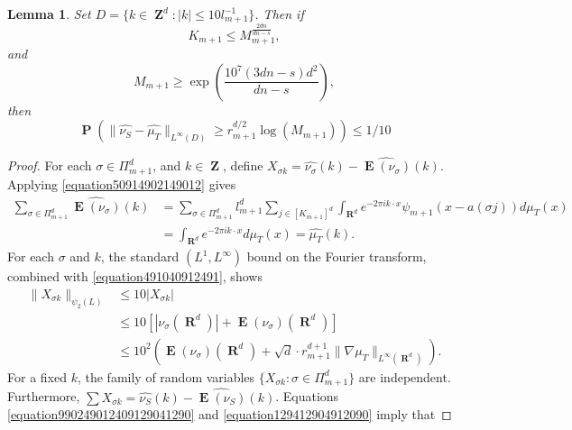 \documentclass[12pt,reqno]{article}
\numberwithin{equation}{section}
\DeclareMathOperator{\RR}{\mathbf{R}}
\DeclareMathOperator{\ZZ}{\mathbf{Z}}
\newtheorem{lemma}[theorem]{Lemma}
\DeclareMathOperator{\EE}{\mathbf{E}}
\DeclareMathOperator{\PP}{\mathbf{P}}
\newcommand{\psitwo}[1]{\| {#1} \|_{\psi_2(L)}}
\begin{document}
\begin{lemma} \label{deviationLemma}
    Set $D = \{ k \in \ZZ^d: |k| \leq 10l_{m+1}^{-1} \}$. Then if
    \begin{equation} \label{equation109519029012}
        K_{m+1} \leq M_{m+1}^{\frac{2dn}{dn - s}},
    \end{equation}
    and
    \begin{equation} \label{equation1940129041}
        M_{m+1} \geq \exp \left( \frac{10^7 (3dn - s) d^2}{dn - s} \right),
    \end{equation}
    then
    \[ \PP \left( \| \widehat{\nu_S} - \widehat{\mu_T} \|_{L^\infty(D)} \geq r_{m+1}^{d/2} \log(M_{m+1}) \right) \leq 1/10 \]
\end{lemma}
\begin{proof}
    For each $\sigma \in \Pi_{m+1}^d$, and $k \in \ZZ$, define $X_{\sigma k} = \widehat{\nu_\sigma}(k) - \widehat{\EE(\nu_\sigma)}(k)$. Applying \eqref{equation50914902149012} gives 
    \begin{equation} \label{equation891248921894128942189}
    \begin{split}
        \sum_{\sigma \in \Pi_{m+1}^d} \widehat{\EE(\nu_\sigma)}(k) &= \sum_{\sigma \in \Pi_{m+1}^d} l_{m+1}^d \sum_{j \in [K_{m+1}]^d} \int_{\RR^d} e^{- 2 \pi i k \cdot x} \psi_{m+1}(x - a(\sigma j)) d\mu_T(x)\\
        &= \int_{\RR^d} e^{-2 \pi i k \cdot x} d\mu_T(x) = \widehat{\mu_T}(k).
    \end{split}
    \end{equation}
    For each $\sigma$ and $k$, the standard $(L^1,L^\infty)$ bound on the Fourier transform, combined with \eqref{equation491040912491}, shows
    \begin{equation} \label{equation12904912049012}
    \begin{split}
        \psitwo{X_{\sigma k}} &\leq 10 | X_{\sigma k} |\\
        &\leq 10[| \nu_\sigma(\RR^d) | + \EE(\nu_\sigma)(\RR^d)]\\
        &\leq 10^2 \left( \EE(\nu_\sigma)(\RR^d) + \sqrt{d} \cdot r_{m+1}^{d+1} \| \nabla \mu_T \|_{L^\infty(\RR^d)} \right).
    \end{split}
    \end{equation}
    For a fixed $k$, the family of random variables $\{ X_{\sigma k} : \sigma \in \Pi_{m+1}^d \}$ are independent. Furthermore, $\sum X_{\sigma k} = \widehat{\nu_S}(k) - \widehat{\EE(\nu_S)}(k)$. Equations \eqref{equation990249012409129041290} and \eqref{equation129412904912090} imply that

\end{proof}
\end{document}
